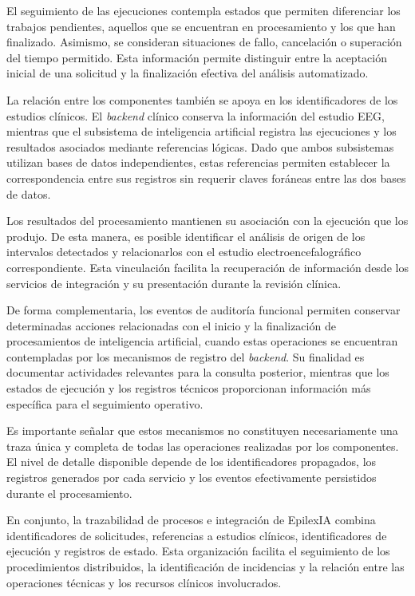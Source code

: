 El seguimiento de las ejecuciones contempla estados
que permiten diferenciar los trabajos pendientes,
aquellos que se encuentran en procesamiento y los
que han finalizado. Asimismo, se consideran situaciones
de fallo, cancelación o superación del tiempo permitido.
Esta información permite distinguir entre la aceptación
inicial de una solicitud y la finalización efectiva
del análisis automatizado.

La relación entre los componentes también se apoya
en los identificadores de los estudios clínicos.
El \textit{backend} clínico conserva la información del
estudio EEG, mientras que el subsistema de inteligencia
artificial registra las ejecuciones y los resultados
asociados mediante referencias lógicas. Dado que
ambos subsistemas utilizan bases de datos independientes,
estas referencias permiten establecer la correspondencia
entre sus registros sin requerir claves foráneas
entre las dos bases de datos.

Los resultados del procesamiento mantienen su
asociación con la ejecución que los produjo. De esta
manera, es posible identificar el análisis de origen
de los intervalos detectados y relacionarlos con el
estudio electroencefalográfico correspondiente. Esta
vinculación facilita la recuperación de información
desde los servicios de integración y su presentación
durante la revisión clínica.

De forma complementaria, los eventos de auditoría
funcional permiten conservar determinadas acciones
relacionadas con el inicio y la finalización de
procesamientos de inteligencia artificial, cuando
estas operaciones se encuentran contempladas por
los mecanismos de registro del \textit{backend}. Su finalidad
es documentar actividades relevantes para la consulta
posterior, mientras que los estados de ejecución y
los registros técnicos proporcionan información
más específica para el seguimiento operativo.

Es importante señalar que estos mecanismos no
constituyen necesariamente una traza única y completa
de todas las operaciones realizadas por los componentes.
El nivel de detalle disponible depende de los
identificadores propagados, los registros generados
por cada servicio y los eventos efectivamente
persistidos durante el procesamiento.

En conjunto, la trazabilidad de procesos e integración
de EpilexIA combina identificadores de solicitudes,
referencias a estudios clínicos, identificadores de
ejecución y registros de estado. Esta organización
facilita el seguimiento de los procedimientos
distribuidos, la identificación de incidencias y
la relación entre las operaciones técnicas y los
recursos clínicos involucrados.


